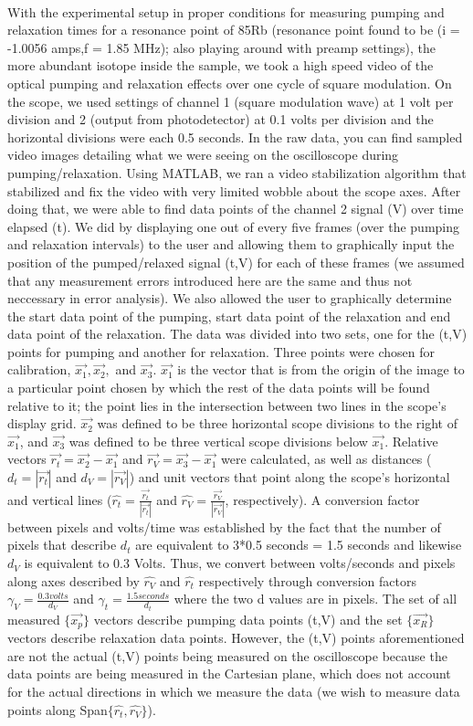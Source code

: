 \documentclass{article}
\begin{document}
\\\indent With the experimental setup in proper conditions for measuring pumping and relaxation times for a resonance point of 85Rb (resonance point found to be (i = -1.0056 amps,f = 1.85 MHz); also playing around with preamp settings), the more abundant isotope inside the sample, we took a high speed video of the optical pumping and relaxation effects over one cycle of square modulation. On the scope, we used settings of channel 1 (square modulation wave) at 1 volt per division and 2 (output from photodetector) at 0.1 volts per division and the horizontal divisions were each 0.5 seconds. In the raw data, you can find sampled video images detailing what we were seeing on the oscilloscope during pumping/relaxation. Using MATLAB, we ran a video stabilization algorithm that stabilized and fix the video with very limited wobble about the scope axes. After doing that, we were able to find data points of the channel 2 signal (V) over time elapsed (t). We did by displaying one out of every five frames (over the pumping and relaxation intervals) to the user and allowing them to graphically input the position of the pumped/relaxed signal (t,V) for each of these frames (we assumed that any measurement errors introduced here are the same and thus not neccessary in error analysis). We also allowed the user to graphically determine the start data point of the pumping, start data point of the relaxation and end data point of the relaxation. The data was divided into two sets, one for the (t,V) points for pumping and another for relaxation. Three points were chosen for calibration, $\vec{x_1},\vec{x_2},$ and $\vec{x_3}$. $\vec{x_1}$ is the vector that is from the origin of the image to a particular point chosen by which the rest of the data points will be found relative to it; the point lies in the intersection between two lines in the scope's display grid. $\vec{x_2}$ was defined to be three horizontal scope divisions to the right of $\vec{x_1}$, and $\vec{x_3}$ was defined to be three vertical scope divisions below $\vec{x_1}$. Relative vectors $\vec{r_t} = \vec{x_2}-\vec{x_1}$ and $\vec{r_V} = \vec{x_3}-\vec{x_1}$ were calculated, as well as distances ($d_t = |\vec{r_t}|$ and $d_V = |\vec{r_V}|$) and unit vectors that point along the scope's horizontal and vertical lines ($\hat{r_t} = \frac{\vec{r_t}}{|\vec{r_t}|}$ and $\hat{r_V} = \frac{\vec{r_V}}{|\vec{r_V}|}$, respectively). A conversion factor between pixels and volts/time was established by the fact that the number of pixels that describe $d_t$ are equivalent to 3*0.5 seconds = 1.5 seconds and likewise $d_V$ is equivalent to 0.3 Volts. Thus, we convert between volts/seconds and pixels along axes described by $\hat{r_V}$ and $\hat{r_t}$ respectively through conversion factors $\gamma_V = \frac{0.3 volts}{d_V}$ and $\gamma_t = \frac{1.5 seconds}{d_t}$ where the two d values are in pixels. The set of all measured $\{\vec{x_p}\}$ vectors describe pumping data points (t,V) and the set $\{\vec{x_R}\}$ vectors describe relaxation data points. However, the (t,V) points aforementioned are not the actual (t,V) points being measured on the oscilloscope because the data points are being measured in the Cartesian plane, which does not account for the actual directions in which we measure the data (we wish to measure data points along Span$\{\hat{r_t},\hat{r_V}\}$).
\end{document}
